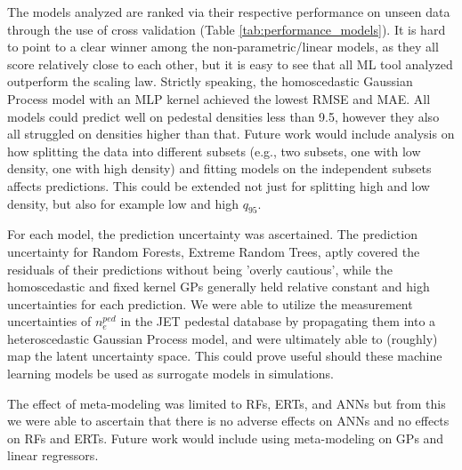 \documentclass[a4paper, twoside, final, 12pt]{article}
\begin{document}
{The models analyzed are ranked via their respective performance on unseen data through the use of cross validation (Table \ref{tab:performance_models}).
It is hard to point to a clear winner among the non-parametric/linear models, as they all score relatively close to each other, but it is easy to see that all ML tool analyzed outperform the scaling law. Strictly speaking, the homoscedastic Gaussian Process model with an MLP kernel achieved the lowest RMSE and MAE. All models could predict well on pedestal densities less than 9.5, however they also all struggled on densities higher than that. Future work would include analysis on how splitting the data into different subsets (e.g., two subsets, one with low density, one with high density) and fitting models on the independent subsets affects predictions. This could be extended not just for splitting high and low density, but also for example low and high $q_{95}$. 

For each model, the prediction uncertainty was ascertained. The prediction uncertainty for Random Forests, Extreme Random Trees, aptly covered the residuals of their predictions without being 'overly cautious', while the homoscedastic and fixed kernel GPs generally held relative constant and high uncertainties for each prediction. We were able to utilize the measurement uncertainties of $n_e^{ped}$ in the JET pedestal database by propagating them into a heteroscedastic Gaussian Process model, and were ultimately able to (roughly) map the latent uncertainty space. This could prove useful should these machine learning models be used as surrogate models in simulations.

The effect of meta-modeling was limited to RFs, ERTs, and ANNs but from this we were able to ascertain that there is no adverse effects on ANNs and no effects on RFs and ERTs. Future work would include using meta-modeling on GPs and linear regressors. 



}
\end{document}
